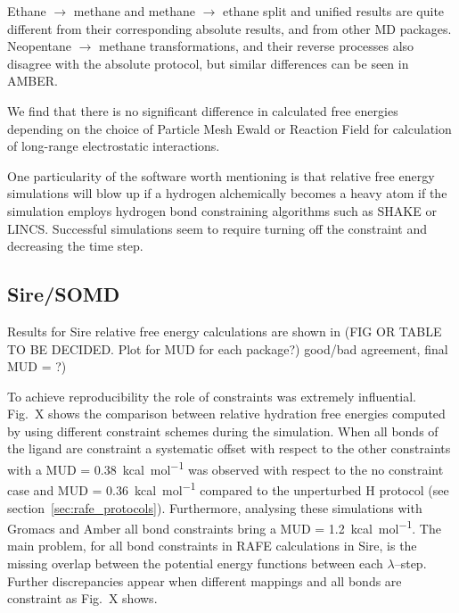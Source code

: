 \documentclass[journal=jctcce,manuscript=article]{achemso}
\begin{document}

Ethane $\rightarrow$ methane and methane $\rightarrow$ ethane split and unified 
results are quite different from their corresponding absolute results, and from other MD packages. %
Neopentane $\rightarrow$ methane transformations, and their reverse processes 
also disagree with the absolute protocol, but similar differences can be seen in AMBER.

We find that there is no significant difference in calculated free energies depending on the choice of 
Particle Mesh Ewald or Reaction Field for calculation of long-range electrostatic interactions. 

One particularity of the software worth mentioning is 
that relative free energy simulations will blow up if a hydrogen alchemically becomes a heavy 
atom if the simulation employs hydrogen bond constraining algorithms such as SHAKE or LINCS.
Successful simulations seem to require turning off the constraint and decreasing the time step.

\subsection{Sire/SOMD}
\label{sec:somd-results}

Results for Sire relative free energy calculations are shown in (FIG OR TABLE
TO BE DECIDED. Plot for MUD for each package?) good/bad agreement, final MUD =
?)

To achieve reproducibility the role of constraints was extremely
influential.  Fig.\ X shows the comparison between relative hydration
free energies computed by using different constraint schemes during
the simulation. When all bonds of the ligand are constraint a
systematic offset with respect to the other constraints with a MUD =
\SI{0.38}{kcal.mol^{-1}} was observed with respect to the no
constraint case and MUD = \SI{0.36}{kcal.mol^{-1}} compared to the
unperturbed H protocol (see section~\ref{sec:rafe_protocols}).
Furthermore, analysing these simulations with Gromacs and Amber all
bond constraints bring a MUD = \SI{1.2}{kcal.mol^{-1}}. The main
problem, for all bond constraints in RAFE calculations in Sire, is the
missing overlap between the potential energy functions between each
$\lambda$--step.  Further discrepancies appear when different
mappings and all bonds are constraint as Fig.\ X shows.
\end{document}
